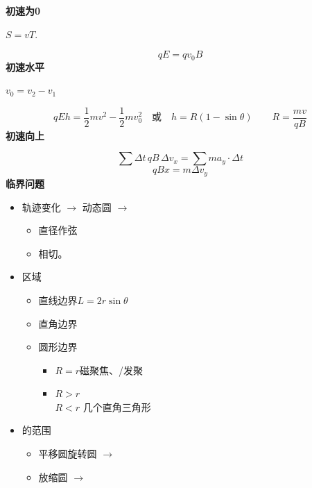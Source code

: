 \textbf{初速为0}


$S=vT$.

\[ qE=qv_0B \]
\textbf{初速水平}

$v_0=v_2-v_1$


\[ qEh=\frac12 mv^2-\frac12 mv_0^2 \quad\text{或}\quad h=R(1-\sin\theta)\qquad R=\frac{mv}{qB} \]
\textbf{初速向上}

\[ \sum\Delta t\,qB\,\Delta v_x=\sum m a_y\cdot\Delta t \] %
\[ qBx=m\Delta v_y \]
\textbf{临界问题}
\begin{itemize}
  \item 轨迹变化 $\to$ 动态圆 $\to$
  \begin{itemize}
    \item 直径作弦
    \item 相切。
  \end{itemize}
  \item 区域
  \begin{itemize}
    \item 直线边界\quad $L=2r\sin\theta$
    \item 直角边界
    \item 圆形边界
    \begin{itemize}
      \item $R=r$\quad 磁聚焦、/发聚
      \item $R>r$ \\ $R<r$ \quad 几个直角三角形\quad {}
    \end{itemize}
  \end{itemize}
  \item {}的范围 %
  \begin{itemize}
    \item 平移圆\red{/}旋转圆 $\to$  %
    \item 放缩圆 $\to$  %
  \end{itemize}
\end{itemize}

